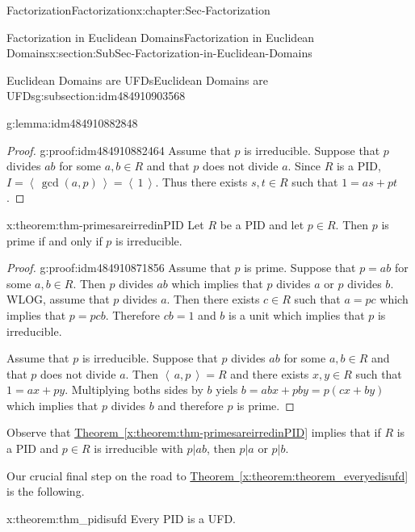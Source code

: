 \documentclass[oneside,10pt,]{book}
\newcommand{\xreffont}{\relax}
\numberwithin{equation}{section}
\newcommand{\ideal}[1]{\left\langle\, #1 \,\right\rangle}
\begin{document}
\begin{chapterptx}{Factorization}{}{Factorization}{}{}{x:chapter:Sec-Factorization}
\begin{sectionptx}{Factorization in Euclidean Domains}{}{Factorization in Euclidean Domains}{}{}{x:section:SubSec-Factorization-in-Euclidean-Domains}
\begin{subsectionptx}{Euclidean Domains are UFDs}{}{Euclidean Domains are UFDs}{}{}{g:subsection:idm484910903568}
\begin{lemma}{}{}{g:lemma:idm484910882848}
\end{lemma}
\begin{proof}{}{g:proof:idm484910882464}
Assume that \(p\) is irreducible. Suppose that \(p\) divides \(ab\) for some \(a,b \in R\) and that \(p\) does not divide \(a\). Since \(R\) is a PID, \(I = \ideal{\gcd(a,p)} = \ideal{1}\). Thus there exists \(s,t\in R\) such that \(1=as+pt\).%
\end{proof}
\begin{theorem}{}{}{x:theorem:thm-primesareirredinPID}%
Let \(R\) be a PID and let \(p\in R\). Then \(p\) is prime if and only if \(p\) is irreducible.%
\end{theorem}
\begin{proof}{}{g:proof:idm484910871856}
Assume that \(p\) is prime. Suppose that \(p=ab\) for some \(a,b \in R\). Then \(p\) divides \(ab\) which implies that \(p\) divides \(a\) or \(p\) divides \(b\). WLOG, assume that \(p\) divides \(a\). Then there exists \(c\in R\) such that \(a=pc\) which implies that \(p=pcb\). Therefore \(cb=1\) and \(b\) is a unit which implies that \(p\) is irreducible.%
\par
Assume that \(p\) is irreducible. Suppose that \(p\) divides \(ab\) for some \(a,b \in R\) and that \(p\) does not divide \(a\). Then \(\ideal{a,p}=R\) and there exists \(x,y\in R\) such that \(1=ax+py\). Multiplying boths sides by \(b\) yiels \(b=abx+pby=p(cx+by)\) which implies that \(p\) divides \(b\) and therefore \(p\) is prime.%
\end{proof}
Observe that \hyperref[x:theorem:thm-primesareirredinPID]{Theorem~{\xreffont\ref{x:theorem:thm-primesareirredinPID}}} implies that if \(R\) is a PID and \(p\in R\) is irreducible with \(p|ab\), then \(p|a\) or \(p|b\).%
\par
Our crucial final step on the road to \hyperref[x:theorem:theorem_everyedisufd]{Theorem~{\xreffont\ref{x:theorem:theorem_everyedisufd}}} is the following.%
\begin{theorem}{}{}{x:theorem:thm_pidisufd}%
Every PID is a UFD.%


\end{theorem}
\end{subsectionptx}
\end{sectionptx}
\end{chapterptx}
\end{document}
